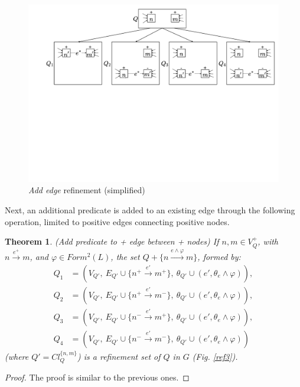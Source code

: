 \documentclass[mathematics,article,submit,pdftex,moreauthors]{Definitions/mdpi}
\newtheorem{theorem}{Theorem}
\begin{document}
\begin{figure}[h]
    \begin{center}
        \includegraphics[width=\columnwidth]{png/REF2SIM.pdf}
    \end{center}
    \caption{%
        \textit{Add edge} refinement (simplified)
    }%
    \label{ref2}
\end{figure}

Next, an additional predicate is added to an existing edge through the following operation, limited to positive edges connecting positive nodes.

\begin{theorem}{(Add predicate to + edge between + nodes)}
    If $n,m\in V_Q^+$, with $n\stackrel {e^+}{\longrightarrow} m$, and $\varphi\in Form^2(L)$, the set $Q+\{n\stackrel {e \wedge \varphi}{\longrightarrow} m\}$, formed by:
    \begin{align*}
    Q_1 &= (V_{Q'},\ E_{Q'}\cup\{n^+\stackrel {e'}{\longrightarrow} m^+\},\ \theta_{Q'}\cup(e',\theta_e\wedge \varphi)), \\
    Q_2 &= (V_{Q'},\ E_{Q'}\cup\{n^+\stackrel {e'}{\longrightarrow} m^-\},\ \theta_{Q'}\cup(e',\theta_e\wedge \varphi)), \\
    Q_3 &= (V_{Q'},\ E_{Q'}\cup\{n^-\stackrel {e'}{\longrightarrow} m^+\},\ \theta_{Q'}\cup(e',\theta_e\wedge \varphi)), \\
    Q_4 &= (V_{Q'},\ E_{Q'}\cup\{n^-\stackrel {e'}{\longrightarrow} m^-\},\ \theta_{Q'}\cup(e',\theta_e\wedge \varphi))
    \end{align*}
    (where $Q'=Cl_Q^{\{n,m\}}$) is a refinement set of $Q$ in $G$ (Fig. \ref{ref3}).
\end{theorem}
\begin{proof}{}
	The proof is similar to the previous ones.
\end{proof}
\end{document}
